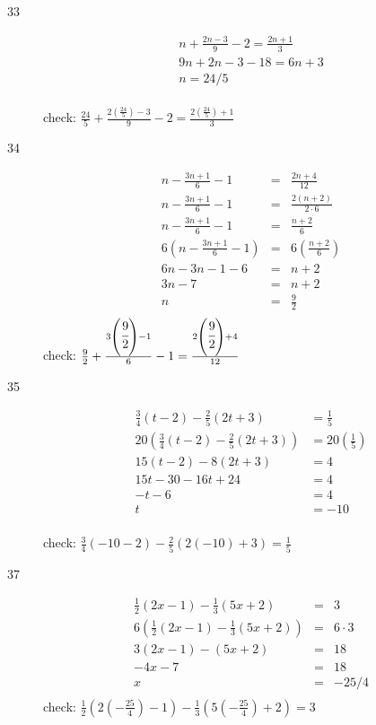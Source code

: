 \documentclass{exam}
\begin{document}
\begin{description}
\item[33]
\begin{eqnarray*}
  n + \frac{2n - 3}{9} - 2 = \frac{2n + 1}{3} \\
  9n + 2n - 3 - 18 = 6n + 3 \\
  n = 24/5 \\
\end{eqnarray*}

check: \( \frac{24}{5} + \frac{2 \left( \frac{24}{5} \right) - 3}{9} - 2 = \frac{2 \left(\frac{24}{5} \right) + 1}{3} \)

\item[34]
\begin{eqnarray*}
  n - \frac{3n + 1}{6} - 1 & = & \frac{2n + 4}{12} \\
  n - \frac{3n + 1}{6} - 1 & = & \frac{2(n + 2)}{2 \cdot 6} \\
  n - \frac{3n + 1}{6} - 1 & = & \frac{n + 2}{6} \\
  6(n - \frac{3n + 1}{6} - 1) & = & 6 \left(\frac{n + 2}{6} \right) \\
  6n - 3n - 1 - 6 & = & n + 2 \\
  3n - 7 & = & n + 2 \\
  n & = & \frac{9}{2} \\
\end{eqnarray*}
check: \( \frac{9}{2} + \frac{3 \left( \cfrac{9}{2} \right) - 1}{6} - 1 = \frac{2 \left( \cfrac{9}{2} \right) + 4}{12}\)

\item[35]
\begin{align*}
  \frac{3}{4}(t - 2) - \frac{2}{5}(2t + 3) &= \frac{1}{5} \\
  20 \left( \frac{3}{4}(t - 2) - \frac{2}{5}(2t + 3) \right) &= 20 \left( \frac{1}{5} \right) \\
  15(t - 2) - 8(2t + 3) &= 4 \\
  15t - 30 - 16t + 24 &= 4 \\
  -t - 6 &= 4 \\
  t &= -10 \\
\end{align*}

check: \( \frac{3}{4}(-10 - 2) - \frac{2}{5}(2(-10) + 3) = \frac{1}{5} \)

\item[37]
\begin{eqnarray*}
  \frac{1}{2}(2x - 1) - \frac{1}{3}(5x + 2) & = & 3 \\
  6 \left( \frac{1}{2}(2x - 1) - \frac{1}{3}(5x + 2) \right) & = & 6 \cdot 3 \\
  3(2x - 1) - (5x + 2) & = & 18 \\
  -4x - 7 & = & 18 \\
   x & = & -25/4 \\
\end{eqnarray*}
check: \( \frac{1}{2}(2(-\frac{25}{4}) - 1) - \frac{1}{3} (5 \left(-\frac{25}{4} \right) + 2) = 3 \)


\end{description}
\end{document}
